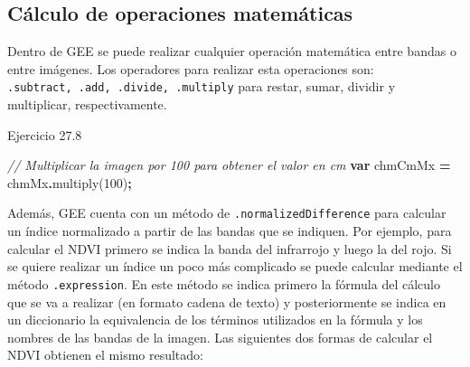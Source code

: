 \documentclass[
  12pt,
  letterpaper,
  twoside]{book}
\newenvironment{Shaded}{\begin{snugshade}}{\end{snugshade}}
\newcommand{\CommentTok}[1]{\textcolor[rgb]{0.56,0.35,0.01}{\textit{#1}}}
\newcommand{\DecValTok}[1]{\textcolor[rgb]{0.00,0.00,0.81}{#1}}
\newcommand{\FunctionTok}[1]{\textcolor[rgb]{0.00,0.00,0.00}{#1}}
\newcommand{\KeywordTok}[1]{\textcolor[rgb]{0.13,0.29,0.53}{\textbf{#1}}}
\newcommand{\NormalTok}[1]{#1}
\newcommand{\OperatorTok}[1]{\textcolor[rgb]{0.81,0.36,0.00}{\textbf{#1}}}
\begin{document}
\hypertarget{cuxe1lculo-de-operaciones-matemuxe1ticas}{%
\subsection*{Cálculo de operaciones matemáticas}\label{cuxe1lculo-de-operaciones-matemuxe1ticas}}

Dentro de GEE se puede realizar cualquier operación matemática entre bandas o entre imágenes. Los operadores para realizar esta operaciones son: \texttt{.subtract,\ .add,\ .divide,\ .multiply} para restar, sumar, dividir y multiplicar, respectivamente.

Ejercicio 27.8

\begin{Shaded}
\begin{Highlighting}[]
\CommentTok{// Multiplicar la imagen por 100 para obtener el valor en cm}
\KeywordTok{var}\NormalTok{ chmCmMx }\OperatorTok{=}\NormalTok{ chmMx}\OperatorTok{.}\FunctionTok{multiply}\NormalTok{(}\DecValTok{100}\NormalTok{)}\OperatorTok{;}
\end{Highlighting}
\end{Shaded}

Además, GEE cuenta con un método de \texttt{.normalizedDifference} para calcular un índice normalizado a partir de las bandas que se indiquen. Por ejemplo, para calcular el NDVI primero se indica la banda del infrarrojo y luego la del rojo. Si se quiere realizar un índice un poco más complicado se puede calcular mediante el método \texttt{.expression}. En este método se indica primero la fórmula del cálculo que se va a realizar (en formato cadena de texto) y posteriormente se indica en un diccionario la equivalencia de los términos utilizados en la fórmula y los nombres de las bandas de la imagen. Las siguientes dos formas de calcular el NDVI obtienen el mismo resultado:
\end{document}
